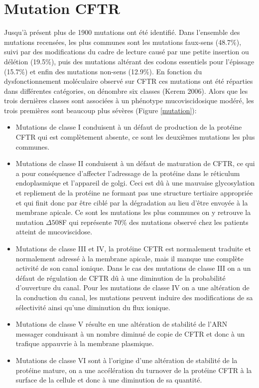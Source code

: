		\section{Mutation CFTR}
Jusqu’à présent plus de 1900 mutations ont été identifié. Dans l’ensemble des mutations recensées, les plus communes sont les mutations faux-sens (48.7\%), suivi par des modifications du cadre de lecture causé par une petite insertion ou délétion (19.5\%), puis des mutations altérant des codons essentiels pour l’épissage (15.7\%) et enfin des mutations non-sens (12.9\%). En fonction du dysfonctionnement moléculaire observé sur CFTR ces mutations ont été réparties dans différentes catégories, on dénombre six classes (Kerem 2006)\cite{kerem_mutation_2006}. Alors que les trois dernières classes sont associées à un phénotype mucoviscidosique modéré, les trois premières sont beaucoup plus sévères (Figure \ref{mutation}):
\begin{itemize}
\item Mutations de classe I conduisent à un défaut de production de la protéine CFTR qui est complètement absente, ce sont les deuxièmes mutations les plus communes.
\item Mutations de classe II conduisent à un défaut de maturation de CFTR, ce qui a pour conséquence d’affecter l’adressage de la protéine dans le réticulum endoplasmique et l’appareil de golgi. Ceci est dû à une mauvaise glycosylation et repliement de la protéine ne formant pas une structure tertiaire appropriée et qui finit donc par être ciblé par la dégradation au lieu d’être envoyée à la membrane apicale. Ce sont les mutations les plus communes on y retrouve la mutation $\Delta508$F qui représente 70\% des mutations observé chez les patients atteint de mucoviscidose. 
\item Mutations de classe III et IV, la protéine CFTR est normalement traduite et normalement adressé à la membrane apicale, mais il manque une complète activité de son canal ionique. Dans le cas des mutations de classe III on a un défaut de régulation de CFTR dû à une diminution de la probabilité d’ouverture du canal. Pour les mutations de classe IV on a une altération de la conduction du canal, les mutations peuvent induire des modifications de sa sélectivité ainsi qu’une diminution du flux ionique. 
\item Mutations de classe V résulte en une altération de stabilité de l’ARN messager conduisant à un nombre diminué de copie de CFTR et donc à un trafique appauvrie à la membrane plasmique. 
\item Mutations de classe VI sont à l’origine d’une altération de stabilité de la protéine mature, on a une accélération du turnover de la protéine CFTR à la surface de la cellule et donc à une diminution de sa quantité.
\end{itemize}

